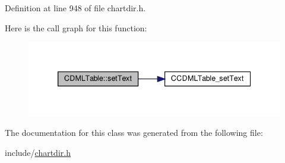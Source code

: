 Definition at line 948 of file chartdir.\+h.

Here is the call graph for this function\+:
\nopagebreak
\begin{figure}[H]
\begin{center}
\leavevmode
\includegraphics[width=339pt]{class_c_d_m_l_table_afc130341376816bb3a668f8cb3124cad_cgraph}
\end{center}
\end{figure}


The documentation for this class was generated from the following file\+:\begin{DoxyCompactItemize}
\item 
include/\hyperlink{chartdir_8h}{chartdir.\+h}\end{DoxyCompactItemize}
